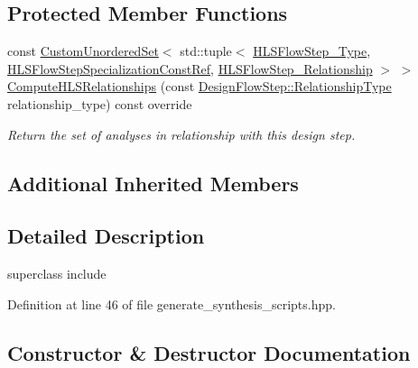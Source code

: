 \subsection*{Protected Member Functions}
\begin{DoxyCompactItemize}
\item 
const \hyperlink{classCustomUnorderedSet}{Custom\+Unordered\+Set}$<$ std\+::tuple$<$ \hyperlink{hls__step_8hpp_ada16bc22905016180e26fc7e39537f8d}{H\+L\+S\+Flow\+Step\+\_\+\+Type}, \hyperlink{hls__step_8hpp_a5fdd2edf290c196531d21d68e13f0e74}{H\+L\+S\+Flow\+Step\+Specialization\+Const\+Ref}, \hyperlink{hls__step_8hpp_a3ad360b9b11e6bf0683d5562a0ceb169}{H\+L\+S\+Flow\+Step\+\_\+\+Relationship} $>$ $>$ \hyperlink{classGenerateSynthesisScripts_a1f8c29d2d284394856b4036bd986140a}{Compute\+H\+L\+S\+Relationships} (const \hyperlink{classDesignFlowStep_a723a3baf19ff2ceb77bc13e099d0b1b7}{Design\+Flow\+Step\+::\+Relationship\+Type} relationship\+\_\+type) const override
\begin{DoxyCompactList}\small\item\em Return the set of analyses in relationship with this design step. \end{DoxyCompactList}\end{DoxyCompactItemize}
\subsection*{Additional Inherited Members}


\subsection{Detailed Description}
superclass include 

Definition at line 46 of file generate\+\_\+synthesis\+\_\+scripts.\+hpp.



\subsection{Constructor \& Destructor Documentation}
\mbox{\label{classGenerateSynthesisScripts_a32f5da813140d858eb3876098b5e6924}} 
